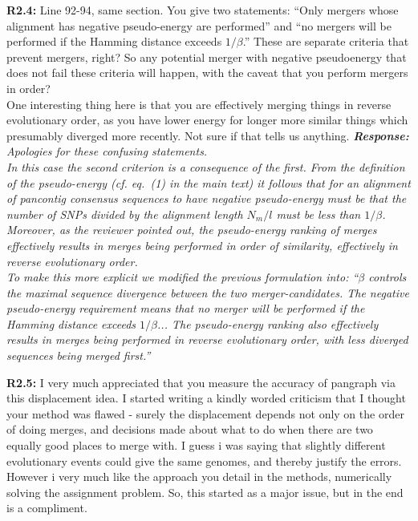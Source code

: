 \documentclass[aps,rmp,onecolumn]{revtex4-1}
\newcommand{\reviewer}[2]{\textbf{#1:} #2\vskip 5mm}
\newcommand{\response}[1]{{\it {\color{response}\textbf{Response:} #1}}\vskip 5mm}
\begin{document}
\reviewer{R2.4}{Line 92-94, same section. You give two statements:
      ``Only mergers whose alignment has negative pseudo-energy are performed''
      and
      ``no mergers will be performed if the Hamming distance exceeds $1/\beta$.''
      These are separate criteria that prevent mergers, right? So any potential merger with negative pseudoenergy that does not fail these criteria will happen, with the caveat that you perform mergers in order?\\
      One interesting thing here is that you are effectively merging things in reverse evolutionary order, as you have lower energy for longer more similar things which presumably diverged more recently. Not sure if that tells us anything.}
\response{
      Apologies for these confusing statements.\\
      In this case the second criterion is a consequence of the first. From the definition of the pseudo-energy (cf. eq.~(1) in the main text) it follows that for an alignment of pancontig consensus sequences to have negative pseudo-energy must be that the number of SNPs divided by the alignment length $N_m/l$ must be less than $1/\beta$. Moreover, as the reviewer pointed out, the pseudo-energy ranking of merges effectively results in merges being performed in order of similarity, effectively in reverse evolutionary order. \\

      To make this more explicit we modified the previous formulation into: ``$\beta$ controls the maximal sequence divergence between the two merger-candidates. The negative pseudo-energy requirement means that no merger will be performed if the Hamming distance exceeds $1/\beta$... The pseudo-energy ranking also effectively results in merges being performed in reverse evolutionary order, with less diverged sequences being merged first.''
}

\reviewer{R2.5}{I very much appreciated that you measure the accuracy of pangraph via this displacement idea. I started writing a kindly worded criticism that I thought your method was flawed - surely the displacement depends not only on the order of doing merges, and decisions made about what to do when there are two equally good places to merge with. I guess i was saying that slightly different evolutionary events could give the same genomes, and thereby justify the errors. However i very much like the approach you detail in the methods, numerically solving the assignment problem. So, this started as a major issue, but in the end is a compliment.}
\end{document}
